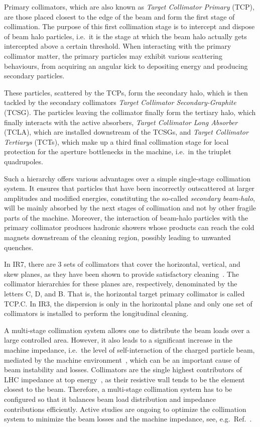 Primary collimators, which are also known as \textit{Target Collimator Primary} (TCP), are those placed closest to the edge of the beam and form the first stage of collimation. The purpose of this first collimation stage is to intercept and dispose of beam halo particles, i.e.\ it is the stage at which the beam halo actually gets intercepted above a certain threshold. When interacting with the primary collimator matter, the primary particles may exhibit various scattering behaviours, from acquiring an angular kick to depositing energy and producing secondary particles. 

These particles, scattered by the TCPs, form the secondary halo, which is then tackled by the secondary collimators \textit{Target Collimator Secondary-Graphite} (TCSG). The particles leaving the collimator finally form the tertiary halo, which finally interacts with the active absorbers, \textit{Target Collimator Long Absorber} (TCLA), which are installed downstream of the TCSGs, and \textit{Target Collimator Tertiarys} (TCTs), which make up a third final collimation stage for local protection for the aperture bottlenecks in the machine, i.e.\ in the triuplet quadrupoles.

Such a hierarchy offers various advantages over a simple single-stage collimation system. It ensures that particles that have been incorrectly outscattered at larger amplitudes and modified energies, constituting the so-called \textit{secondary beam-halo}, will be mainly absorbed by the next stages of collimation and not by other fragile parts of the machine. Moreover, the interaction of beam-halo particles with the primary collimator produces hadronic showers whose products can reach the cold magnets downstream of the cleaning region, possibly leading to unwanted quenches.

In IR7, there are 3 sets of collimators that cover the horizontal, vertical, and skew planes, as they have been shown to provide satisfactory cleaning~\cite{Jeanneret:368725}. The collimator hierarchies for these planes are, respectively, denominated by the letters C, D, and B. That is, the horizontal target primary collimator is called TCP.C. In IR3, the dispersion is only in the horizontal plane and only one set of collimators is installed to perform the longitudinal cleaning.

A multi-stage collimation system allows one to distribute the beam loads over a large controlled area. However, it also leads to a significant increase in the machine impedance, i.e.\ the level of self-interaction of the charged particle beam, mediated by the machine environment~\cite{Wiedemann2007}, which can be an important cause of beam instability and losses. Collimators are the single highest contributors of LHC impedance at top energy~\cite{Mounet:1451296}, as their resistive wall tends to be the element closest to the beam. Therefore, a multi-stage collimation system has to be configured so that it balances beam load distribution and impedance contributions efficiently. Active studies are ongoing to optimize the collimation system to minimize the beam losses and the machine impedance, see, e.g.\ Ref.~\cite{Antipov:2648423}.

